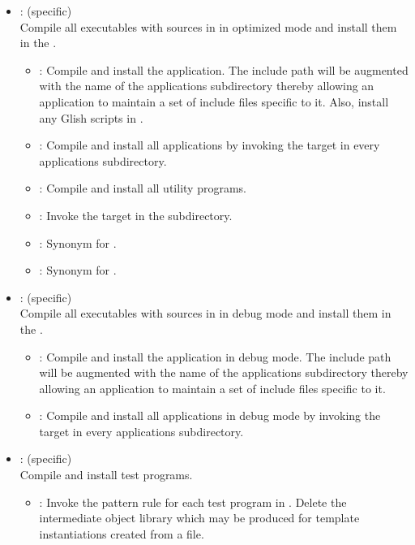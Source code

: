 \begin{itemize}
\item
    : (specific)
   \\ Compile all executables with sources in  in optimized
   mode and install them in the .
   \begin{itemize}
   \item
      : Compile and install the application.  The include path will
      be augmented with the name of the applications subdirectory thereby
      allowing an application to maintain a set of include files specific to
      it.  Also, install any Glish scripts in .
   \item
      : Compile and install all applications by invoking the
       target in every applications subdirectory.
   \item
      : Compile and install all utility programs.
   \item
      : Invoke the  target in the 
      subdirectory.
   \item
      : Synonym for .
   \item
      : Synonym for .
   \end{itemize}

\item
    : (specific)
   \\ Compile all executables with sources in  in debug mode
   and install them in the .
   \begin{itemize}
   \item
      : Compile and install the application in debug mode.  The
      include path will be augmented with the name of the applications
      subdirectory thereby allowing an application to maintain a set of
      include files specific to it.
   \item
      : Compile and install all applications in debug mode by
      invoking the  target in every applications subdirectory.
   \end{itemize}

\item
    : (specific)
   \\ Compile and install test programs.
   \begin{itemize}
   \item
      : Invoke the  pattern rule for each test
      program in .  Delete the intermediate object library
      which may be produced for template instantiations created from a
       file.
   \end{itemize}


\end{itemize}
